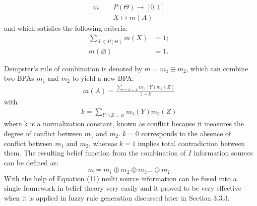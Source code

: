 \documentclass{elsarticle}
\begin{document}
\begin{equation}
\begin{aligned}
m:&  &P(\Theta)\rightarrow [0,1]\\
  &  &X\mapsto m(A)
\end{aligned}
\end{equation}
and which satisfies the following criteria:
\begin{equation}
\begin{aligned}
\sum\limits_{X\in{P(\Theta)}}m(X)&=1;\\
m(\varnothing)&=1.
\end {aligned}
\end{equation}

Dempster's rule of combination is denoted by $m=m_1\oplus m_2$, which can combine two BPAs $m_1$ and $m_2$ to yield a new BPA:
\begin{equation}
\begin{aligned}
m(A)=\frac{\sum\limits_{Y\cap Z=X}m_1(Y)m_2(Z)}{1-k}
\end{aligned}
\end{equation}
with
\begin{equation}
\begin{aligned}
k=\sum\limits_{Y\cap Z=\varnothing}m_1(Y)m_2(Z)
\end{aligned}
\end{equation}
where k is a normalization constant, known as conflict because it measures the degree of conflict between $m_1$ and $m_2$. $k=0$ corresponds to the absence of conflict between $m_1$ and $m_2$, whereas $k=1$ implies total contradiction between them. The resulting belief function from the combination of $I$ information sources can be defined as:
\begin{equation}
m=m_1\oplus m_2 \oplus m_3 ... \oplus m_I
\end{equation} 
With the help of Equation (11) multi source information can be fused into a single framework in belief theory very 
easily and it proved to be very effective when it is applied in fuzzy rule generation discussed later in Section 3.3.3. 
\end{document}
